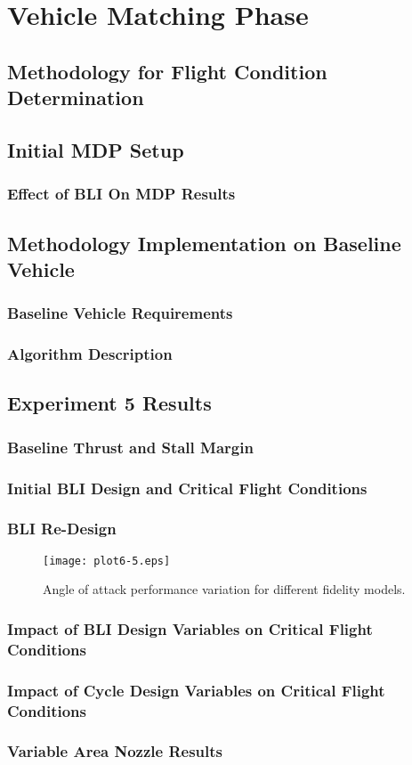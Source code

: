 \chapter{Vehicle Matching Phase}
\section{Methodology for Flight Condition Determination}
\section{Initial MDP Setup}
\subsection{Effect of BLI On MDP Results}
\section{Methodology Implementation on Baseline Vehicle}
\subsection{Baseline Vehicle Requirements}
\subsection{Algorithm Description}
\section{Experiment 5 Results}
\subsection{Baseline Thrust and Stall Margin}
\subsection{Initial BLI Design and Critical Flight Conditions}
\subsection{BLI Re-Design}

	\begin{figure}[p]
	\centering
	\texttt{[image: plot6-5.eps]}
	\caption{Angle of attack performance variation for different fidelity models.}
	\label{alpha_sweeps}
	\end{figure}

\subsection{Impact of BLI Design Variables on Critical Flight Conditions}
\subsection{Impact of Cycle Design Variables on Critical Flight Conditions}
\subsection{Variable Area Nozzle Results}

